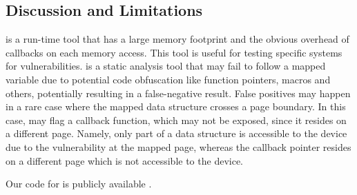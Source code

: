 \subsection{Discussion and Limitations}
\dkasan is a run-time tool that has a large memory footprint and the obvious overhead of callbacks on each memory access. This tool is useful for testing specific systems for vulnerabilities.
\tool is a static analysis tool that may fail to follow a mapped variable due to potential code obfuscation like function pointers, macros and others, potentially resulting in a false-negative result. False positives may happen in a rare case
where the mapped data structure crosses a  page boundary. In this case, \tool may flag a callback function, which may not be exposed, since it resides on a different page. Namely, only part of a data structure is accessible to the device due to the \subpage{} vulnerability at the mapped page, whereas the callback pointer resides on a different page which is not accessible to the device.%

Our code for \dkasan is publicly available \cite{DKASAN}.